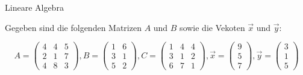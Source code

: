 \documentclass[addpoints,a4paper,ngerman,12pt,answers]{exam}
\begin{document}
\begin{questions}
    \question Lineare Algebra

    Gegeben sind die folgenden Matrizen $A$ und $B$ sowie die Vekoten $\vec{x}$ und $\vec{y}$:

    \begin{equation*}
        A =
        \begin{pmatrix}
        4 & 4 & 5 \\
        2 & 1 & 7 \\
        4 & 8 & 3
        \end{pmatrix}
        ,
        B =
        \begin{pmatrix}
        1 & 6 \\
        3 & 1 \\
        5 & 2
        \end{pmatrix}
        ,
        C =
        \begin{pmatrix}
        1 & 4 & 4 \\
        3 & 1 & 2\\
        6 & 7 & 1
        \end{pmatrix}
        ,
        \vec{x} =
        \begin{pmatrix}
        9 \\
        5 \\
        7
        \end{pmatrix}
        ,
        \vec{y} =
        \begin{pmatrix}
        3 \\
        1 \\
        5
        \end{pmatrix}
    \end{equation*}

    \vspace{0.3cm}

\end{questions}
\end{document}
